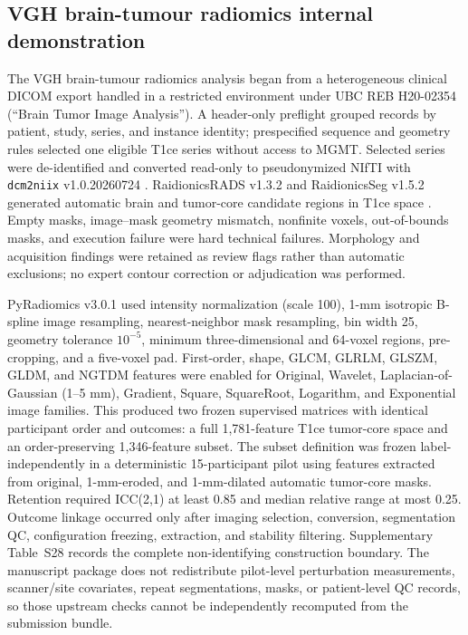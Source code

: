 \subsection{VGH brain-tumour radiomics internal demonstration}

The VGH brain-tumour radiomics analysis began from a heterogeneous clinical DICOM export handled in a restricted environment under UBC REB H20-02354 (``Brain Tumor Image Analysis''). A header-only preflight grouped records by patient, study, series, and instance identity; prespecified sequence and geometry rules selected one eligible T1ce series without access to MGMT. Selected series were de-identified and converted read-only to pseudonymized NIfTI with \texttt{dcm2niix} v1.0.20260724 \citep{ref51}. RaidionicsRADS v1.3.2 and RaidionicsSeg v1.5.2 generated automatic brain and tumor-core candidate regions in T1ce space \citep{ref50}. Empty masks, image--mask geometry mismatch, nonfinite voxels, out-of-bounds masks, and execution failure were hard technical failures. Morphology and acquisition findings were retained as review flags rather than automatic exclusions; no expert contour correction or adjudication was performed.

PyRadiomics v3.0.1 \citep{ref43} used intensity normalization (scale 100), 1-mm isotropic B-spline image resampling, nearest-neighbor mask resampling, bin width 25, geometry tolerance $10^{-5}$, minimum three-dimensional and 64-voxel regions, pre-cropping, and a five-voxel pad. First-order, shape, GLCM, GLRLM, GLSZM, GLDM, and NGTDM features were enabled for Original, Wavelet, Laplacian-of-Gaussian (1--5 mm), Gradient, Square, SquareRoot, Logarithm, and Exponential image families. This produced two frozen supervised matrices with identical participant order and outcomes: a full 1,781-feature T1ce tumor-core space and an order-preserving 1,346-feature subset. The subset definition was frozen label-independently in a deterministic 15-participant pilot using features extracted from original, 1-mm-eroded, and 1-mm-dilated automatic tumor-core masks. Retention required ICC(2,1) at least 0.85 and median relative range at most 0.25. Outcome linkage occurred only after imaging selection, conversion, segmentation QC, configuration freezing, extraction, and stability filtering. Supplementary Table~S28 records the complete non-identifying construction boundary. The manuscript package does not redistribute pilot-level perturbation measurements, scanner/site covariates, repeat segmentations, masks, or patient-level QC records, so those upstream checks cannot be independently recomputed from the submission bundle.

